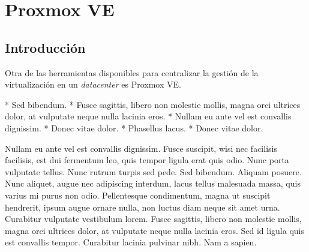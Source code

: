 \chapter{Proxmox VE}
\label{sec:ovirt}

\section{Introducción}
\label{sec:ovirt_install}

Otra de las herramientas disponibles para centralizar la gestión de la virtualización en un \emph{datacenter} es Proxmox VE. 

* Sed bibendum.
* Fusce sagittis, libero non molestie mollis, magna orci ultrices dolor, at vulputate neque nulla lacinia eros.
* Nullam eu ante vel est convallis dignissim.
* Donec vitae dolor.
* Phasellus lacus.
* Donec vitae dolor.

Nullam eu ante vel est convallis dignissim.  Fusce suscipit, wisi nec facilisis facilisis, est dui fermentum leo, quis tempor ligula erat quis odio.  Nunc porta vulputate tellus.  Nunc rutrum turpis sed pede.  Sed bibendum.  Aliquam posuere.  Nunc aliquet, augue nec adipiscing interdum, lacus tellus malesuada massa, quis varius mi purus non odio.  Pellentesque condimentum, magna ut suscipit hendrerit, ipsum augue ornare nulla, non luctus diam neque sit amet urna.  Curabitur vulputate vestibulum lorem.  Fusce sagittis, libero non molestie mollis, magna orci ultrices dolor, at vulputate neque nulla lacinia eros.  Sed id ligula quis est convallis tempor.  Curabitur lacinia pulvinar nibh.  Nam a sapien.


